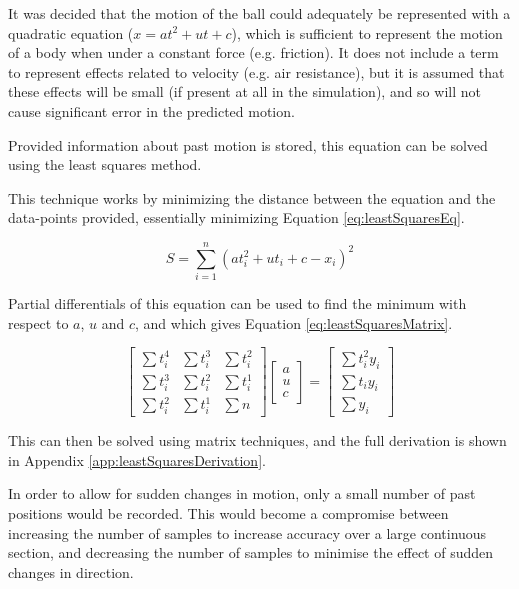 \documentclass[10pt]{article}
\begin{document}
It was decided that the motion of the ball could adequately be represented with
a quadratic equation ($x=at^2+ut+c$), which is sufficient to represent the
motion of a body when under a constant force (e.g. friction).  It does not
include a term to represent effects related to velocity (e.g. air resistance),
but it is assumed that these effects will be small (if present at all in the
simulation), and so will not cause significant error in the predicted motion.

Provided information about past motion is stored, this equation can be solved
using the least squares method.  

This technique works by minimizing the distance between the equation and the
data-points provided, essentially minimizing Equation \ref{eq:leastSquaresEq}.

\begin{equation}
  S = \sum_{i=1}^n (a t_i^2+ u t_i + c - x_i)^2 
  \label{eq:leastSquaresEq}
\end{equation}

Partial differentials of this equation can be used to find the minimum with
respect to $a$, $u$ and $c$, and which gives Equation
\ref{eq:leastSquaresMatrix}.

\begin{equation}
  \left[
   \begin{matrix}
    \sum t_i^4 & \sum t_i^3 & \sum t_i^2 \\
    \sum t_i^3 & \sum t_i^2 & \sum t_i^1 \\
    \sum t_i^2 & \sum t_i^1 & \sum n
   \end{matrix}
  \right]
  \left[
   \begin{matrix}
    a \\
    u \\
    c
   \end{matrix}
  \right]
  =
  \left[
   \begin{matrix}
    \sum t_i^2 y_i \\
    \sum t_i y_i \\
    \sum y_i
   \end{matrix}
  \right]
  \label{eq:leastSquaresMatrix}
\end{equation}

This can then be solved using matrix techniques, and the full derivation is
shown in Appendix \ref{app:leastSquaresDerivation}.

In order to allow for sudden changes in motion, only a small number of past
positions would be recorded.  This would become a compromise between increasing
the number of samples to increase accuracy over a large continuous section, and
decreasing the number of samples to minimise the effect of sudden changes in
direction.
\end{document}
